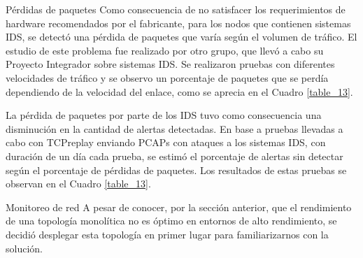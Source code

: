     \begin{subsection}{Pérdidas de paquetes}
    Como consecuencia de no satisfacer los requerimientos de hardware recomendados por el fabricante, para los nodos que contienen sistemas IDS, se detectó una pérdida de paquetes que varía según el volumen de tráfico. El estudio de este problema fue realizado por otro grupo, que llevó a cabo su Proyecto Integrador sobre sistemas IDS. Se realizaron pruebas con diferentes velocidades de tráfico y se observo un porcentaje de paquetes que se perdía dependiendo de la velocidad del enlace, como se aprecia en el Cuadro \ref{table_13}.\par
    \begin{table}[H]
    \caption{Perdida de paquetes y alertas no detectadas, según la velocidad del enlace}
    \label{table_13}
    \end{table}
    La pérdida de paquetes por parte de los IDS tuvo como consecuencia una disminución en la cantidad de alertas detectadas. En base a pruebas llevadas a cabo con TCPreplay\cite{tcpreplay} enviando PCAPs con ataques a los sistemas IDS, con duración de un día cada prueba, se estimó el porcentaje de alertas sin detectar según el porcentaje de pérdidas de paquetes. Los resultados de estas pruebas se observan en el Cuadro \ref{table_13}.
    \end{subsection}
    \begin{section}{Monitoreo de red}
    A pesar de conocer, por la sección anterior, que el rendimiento de una topología monolítica no es óptimo en entornos de alto rendimiento, se decidió desplegar esta topología en primer lugar para familiarizarnos con la solución.\par
    \end{section}
